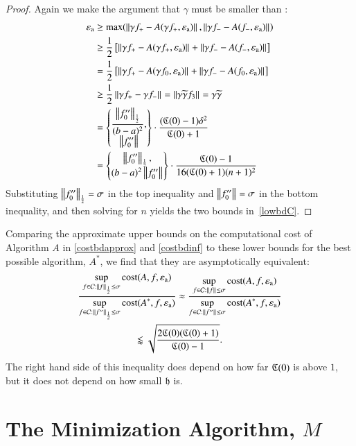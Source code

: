 \documentclass[review]{elsarticle}
\newcommand{\abstol}{\varepsilon_{\textrm{a}}}
\theoremstyle{definition}
\newcommand{\tgamma}{\widetilde{\gamma}}
\begin{document}
\begin{proof}
Again we make the argument that $\gamma$ must be smaller than :
\begin{align*}
\abstol & \ge \max(\norm{\gamma f_+-A(\gamma f_+,\abstol)},\norm{\gamma f_--A(f_-, \abstol)}) \\
& \ge \frac{1}{2} \left[ \norm{\gamma f_+-A(\gamma f_+,\abstol)}+ \norm{\gamma f_--A(f_-, \abstol)} \right] \\
& = \frac{1}{2} \left[ \norm{\gamma f_+-A(\gamma f_0,\abstol)}+ \norm{\gamma f_--A(f_0, \abstol)} \right] \\
& \ge \frac{1}{2}  \norm{\gamma f_+ - \gamma f_-} =  \norm{\gamma \tgamma f_3} = \gamma \tgamma\\
& = \begin{Bmatrix} \displaystyle
\frac{\norm[\frac 12]{f_0''}}{(b-a)^2}, \\
\norm{f_0''}
\end{Bmatrix}  \cdot \frac{(\fC(0)-1)\delta^2}{\fC(0)+1} \\
& = \begin{Bmatrix} \displaystyle
\norm[\frac 12]{f_0''}, \\
(b-a)^2\norm{f_0''}
\end{Bmatrix}  \cdot \frac{\fC(0)-1}{16(\fC(0)+1)(n+1)^2}
\end{align*}
Substituting $\norm[\frac12]{f_0''} = \sigma$ in the top inequality and $\norm{f_0''} = \sigma$ in the bottom inequality, and then solving for $n$ yields the two bounds in~\eqref{lowbdC}.
\end{proof}

Comparing the approximate upper bounds on the computational cost of Algorithm $A$ in  \eqref{costbdapprox} and \eqref{costbdinf} to these lower bounds for the best possible algorithm, $A^*$, we find that they are asymptotically equivalent:
\begin{multline*}
\frac{\displaystyle \sup_{f \in \cc : \norm[\frac 12]{f} \le \sigma} \cost(A,f,\abstol)}{\displaystyle	\sup_{f \in \cc : \norm[\frac12]{f''} \le\sigma } \cost(A^*,f,\abstol) } \approx
\frac{\displaystyle \sup_{f \in \cc : \norm{f} \le \sigma} \cost(A,f,\abstol)}{\displaystyle	\sup_{f \in \cc : \norm{f''} \le\sigma } \cost(A^*,f,\abstol) } \\ \lessapprox \sqrt{\frac{2 \fC(0)(\fC(0)+1)}{\fC(0)-1}}.
\end{multline*}
The right hand side of this inequality does depend on how far $\fC(0)$ is above $1$, but it does not depend on how small $\fh$ is.

\section{The Minimization Algorithm, $M$} \label{sec:funmin}
\end{document}
